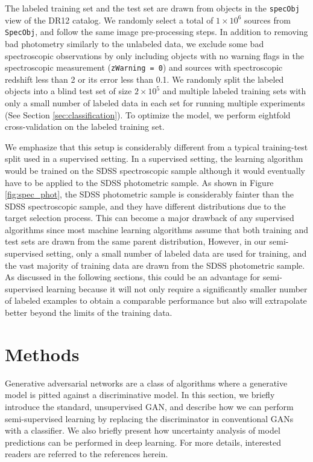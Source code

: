 The labeled training set and the test set are drawn from objects in the \texttt{specObj} view of the DR12 catalog.
We randomly select a total of $1 \times 10^6$ sources from \texttt{SpecObj}, and follow the same image pre-processing steps.
In addition to removing bad photometry similarly to the unlabeled data,
we exclude some bad spectroscopic observations by only including objects with no warning flags in the spectroscopic measurement
(\ie \texttt{zWarning = 0})
and sources with spectroscopic redshift less than 2 or its error less than 0.1.
We randomly split the labeled objects into a blind test set of size $ 2 \times 10^5$ and multiple labeled training sets
with only a small number of labeled data in each set for running multiple experiments (See Section \ref{sec:classification}).
To optimize the model, we perform eightfold cross-validation on the labeled training set.

We emphasize that this setup is considerably different from a typical training-test split used in a supervised setting.
In a supervised setting, the learning algorithm would be trained on the SDSS spectroscopic sample
although it would eventually have to be applied to the SDSS photometric sample.
As shown in Figure \ref{fig:spec_phot}, the SDSS photometric sample is considerably fainter than the SDSS spectroscopic sample,
and they have different distributions due to the target selection process.
This can become a major drawback of any supervised algorithms since most machine learning algorithms assume that both
training and test sets are drawn from the same parent distribution,
However, in our semi-supervised setting, only a small number of labeled data are used for training,
and the vast majority of training data are drawn from the SDSS photometric sample.
As discussed in the following sections, this could be an advantage for semi-supervised learning because
it will not only require a significantly smaller number of labeled examples to obtain a comparable performance
but also will extrapolate better beyond the limits of the training data.

\section{Methods}
  \label{sec:methods}
  
Generative adversarial networks \citep[GANs;][]{goodfellow2014generative} are a class of algorithms where
a generative model is pitted against a discriminative model.
In this section, we briefly introduce the standard, unsupervised GAN, and describe how we can perform semi-supervised learning
by replacing the discriminator in conventional GANs with a classifier.
We also briefly present how uncertainty analysis of model predictions can be performed in deep learning.
For more details, interested readers are referred to the references herein.

